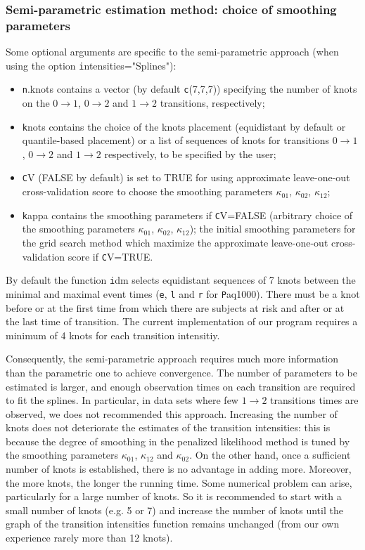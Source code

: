 \documentclass{article}
\newcommand{\code}[1]{{\texttt #1}}
\begin{document}
\subsubsection{Semi-parametric estimation method: choice of smoothing parameters}
\label{sec-5-3-1}

Some optional arguments are specific to the semi-parametric approach
(when using the option \code{intensities="Splines"}):

\begin{itemize}
\item \code{n.knots} contains a vector (by default \code{c(7,7,7)})
specifying the number of knots on the $0 \rightarrow 1$, $0
  \rightarrow 2$ and $1 \rightarrow 2$ transitions, respectively;
\item \code{knots} contains the choice of the knots placement (equidistant
by default or quantile-based placement) or a list of sequences of
knots for transitions $0 \rightarrow 1$, $0 \rightarrow 2$ and $1
  \rightarrow 2$ respectively, to be specified by the user;
\item \code{CV} (FALSE by default) is set to TRUE for using approximate
leave-one-out cross-validation score to choose the smoothing
parameters $\kappa_{01}$, $\kappa_{02}$, $\kappa_{12}$;
\item \code{kappa} contains the smoothing parameters if \code{CV=FALSE}
(arbitrary choice of the smoothing parameters $\kappa_{01}$,
$\kappa_{02}$, $\kappa_{12}$); the initial smoothing parameters for
the grid search method which maximize the approximate leave-one-out
cross-validation score if \code{CV=TRUE}.
\end{itemize}

By default the function \code{idm} selects equidistant sequences of 7
knots between the minimal and maximal event times (\code{e}, \code{l}
and \code{r} for \code{Paq1000}). There must be a knot before or at
the first time from which there are subjects at risk and after or at
the last time of transition. The current implementation of our program
requires a minimum of 4 knots for each transition intensitiy.


Consequently, the semi-parametric approach
requires much more information than the parametric one to achieve
convergence. The number of parameters to be estimated is larger, and
enough observation times on each transition are required to fit the
splines.  In particular, in data sets where few $1 \rightarrow 2$
transitions times are observed, we does not recommended this approach.
Increasing the number of knots does not deteriorate the estimates of
the transition intensities: this is because the degree of smoothing in
the penalized likelihood method is tuned by the smoothing parameters
$\kappa_{01}$, $\kappa_{12}$ and $\kappa_{02}$.  On the other hand,
once a sufficient number of knots is established, there is no
advantage in adding more.  Moreover, the more knots, the longer the
running time.  Some numerical problem can arise, particularly for a
large number of knots. 
So it is recommended to start with a small number of
knots (e.g. 5 or 7) and increase the number of knots until the graph
of the transition intensities function remains unchanged (from our own
experience rarely more than 12 knots).
\end{document}
